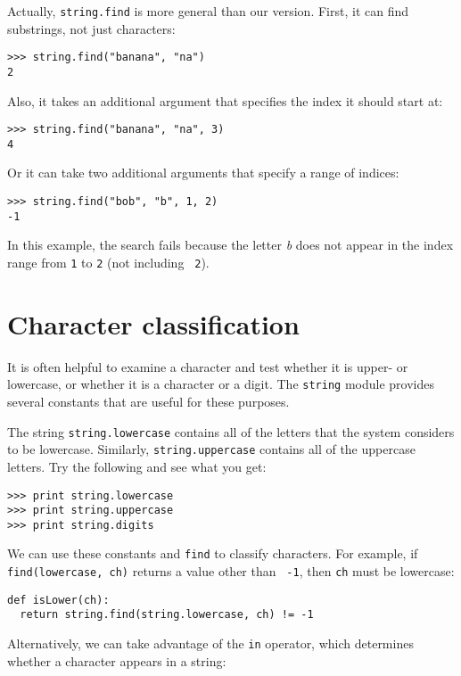 Actually, {\tt string.find} is more general than our version.  First,
it can find substrings, not just characters:

\beforeverb
\begin{verbatim}
>>> string.find("banana", "na")
2
\end{verbatim}
\afterverb
%
Also, it takes an additional argument that specifies the index it
should start at:

\beforeverb
\begin{verbatim}
>>> string.find("banana", "na", 3)
4
\end{verbatim}
\afterverb
%
Or it can take two additional arguments that specify a range
of indices:

\beforeverb
\begin{verbatim}
>>> string.find("bob", "b", 1, 2)
-1
\end{verbatim}
\afterverb
%
In this example, the search fails because the letter {\em b} does not
appear in the index range from {\tt 1} to {\tt 2} (not including {\tt
2}).


\section{Character classification}
\label{in}

It is often helpful to examine a character and test whether it is
upper- or lowercase, or whether it is a character or a digit.  The
{\tt string} module provides several constants that are
useful for these purposes.

The string {\tt string.lowercase} contains all of the letters that the
system considers to be lowercase.  Similarly, {\tt string.uppercase}
contains all of the uppercase letters.  Try the following and see what
you get:

\beforeverb
\begin{verbatim}
>>> print string.lowercase
>>> print string.uppercase
>>> print string.digits
\end{verbatim}
\afterverb
%
We can use these constants and {\tt find} to classify characters. For
example, if {\tt find(lowercase, ch)} returns a value other than {\tt
-1}, then {\tt ch} must be lowercase:

\beforeverb
\begin{verbatim}
def isLower(ch):
  return string.find(string.lowercase, ch) != -1
\end{verbatim}
\afterverb
%
Alternatively, we can take advantage of the {\tt in} operator, which
determines whether a character appears in a string:

